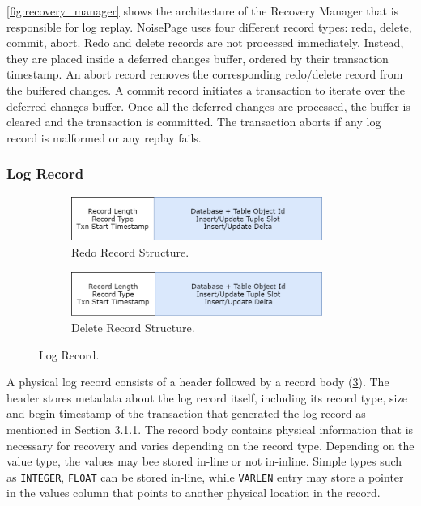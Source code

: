 \documentclass[12pt]{cmuthesis}
\begin{document}
\cref{fig:recovery_manager} shows the architecture of the Recovery Manager that is responsible for log replay. NoisePage uses four different record types: redo, delete, commit, abort. Redo and delete records are not processed immediately. Instead, they are placed inside a deferred changes buffer, ordered by their transaction timestamp. An abort record removes the corresponding redo/delete record from the buffered changes. A commit record initiates a transaction to iterate over the deferred changes buffer. Once all the deferred changes are processed, the buffer is cleared and the transaction is committed. The transaction aborts if any log record is malformed or any replay fails.

\subsubsection{Log Record}
\begin{figure}[t!]
\centering
\begin{subfigure}{.5\textwidth}
 \centering
 \includegraphics[width=0.9\textwidth]{images/RedoRecord.png}
 \caption{Redo Record Structure.}
  \label{fig:pipeline_graph}
\end{subfigure}%
\begin{subfigure}{.5\textwidth}
 \centering
 \includegraphics[width=0.9\textwidth]{images/DeleteRecord.png}
 \caption{Delete Record Structure.}
  \label{fig:pipeline_code}
\end{subfigure}
\caption{Log Record.}
\label{fig:log_record}
\end{figure}

A physical log record consists of a header followed by a record body (\cref{fig:log_record}). The header stores metadata about the log record itself, including its record type, size and begin timestamp of the transaction that generated the log record as mentioned in Section 3.1.1. The record body contains physical information that is necessary for recovery and varies depending on the record type. Depending on the value type, the values may bee stored in-line or not in-inline. Simple types such as \texttt{INTEGER}, \texttt{FLOAT} can be stored in-line, while \texttt{VARLEN} entry may store a pointer in the values column that points to another physical location in the record.
\end{document}
